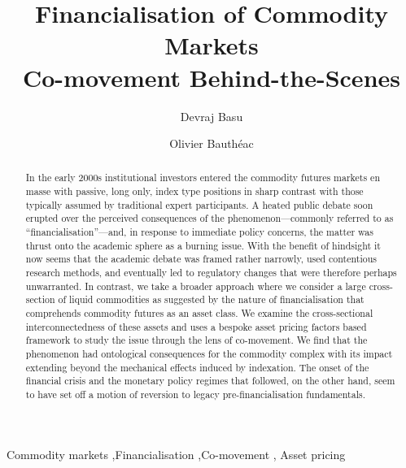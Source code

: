 \documentclass[
  authoryear,
  preprint,
  3p]{elsarticle}
\begin{document}
\begin{frontmatter}
\title{Financialisation of Commodity Markets \\\large{Co-movement
Behind-the-Scenes} }
\author[1]{Devraj Basu%
%
}
\author[1]{Olivier Bauthéac%
%
}




        
\begin{abstract}
In the early 2000s institutional investors entered the commodity futures
markets en masse with passive, long only, index type positions in sharp
contrast with those typically assumed by traditional expert
participants. A heated public debate soon erupted over the perceived
consequences of the phenomenon---commonly referred to as
``financialisation''---and, in response to immediate policy concerns,
the matter was thrust onto the academic sphere as a burning issue. With
the benefit of hindsight it now seems that the academic debate was
framed rather narrowly, used contentious research methods, and
eventually led to regulatory changes that were therefore perhaps
unwarranted. In contrast, we take a broader approach where we consider a
large cross-section of liquid commodities as suggested by the nature of
financialisation that comprehends commodity futures as an asset class.
We examine the cross-sectional interconnectedness of these assets and
uses a bespoke asset pricing factors based framework to study the issue
through the lens of co-movement. We find that the phenomenon had
ontological consequences for the commodity complex with its impact
extending beyond the mechanical effects induced by indexation. The onset
of the financial crisis and the monetary policy regimes that followed,
on the other hand, seem to have set off a motion of reversion to legacy
pre-financialisation fundamentals.
\end{abstract}





\begin{keyword}
    Commodity markets \sep Financialisation \sep Co-movement \sep 
    Asset pricing
\end{keyword}
\end{frontmatter}
    
\end{document}

